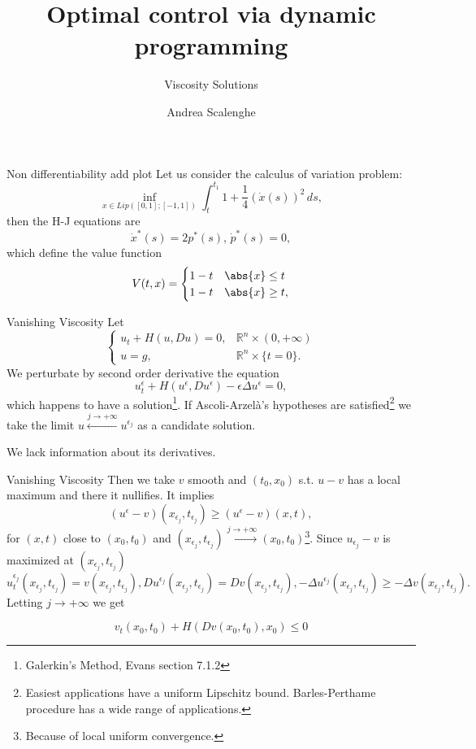 \documentclass[10pt, compress]{beamer}
\title{Optimal control via dynamic programming}
\subtitle{Viscosity Solutions}
\author{Andrea Scalenghe}
\institute{Tesi magistrale}
\newcommand{\R}{\mathbb{R}}
\begin{document}
\maketitle

\begin{frame}{Non differentiability}
add plot
   Let us consider the calculus of variation problem:
\begin{equation*}
    \inf_{x\in Lip([0,1];[-1,1])} \int_t^{t_1} 1 + \frac{1}{4}(\dot{x}(s))^2 \,ds,
\end{equation*}
then the H-J equations are
\[\dot{x}^{\ast}(s) = 2p^{\ast}(s),\,
    \dot{p}^{\ast}(s) = 0,\]
    which define the value function
    \[V(t,x)=\begin{cases}
    1-t & \abs{x}\leq t \\
    1-t& \abs{x}\geq t,
\end{cases}\]
\end{frame}

\begin{frame}{Vanishing Viscosity}
    Let
    \begin{equation}\label{4-1-fullynonlinear}
    \begin{cases}
        u_t + H(u,Du) = 0,& \R^n\times(0,+\infty) \\
        u = g,& \R^n\times\{t=0\}.
    \end{cases}
\end{equation}
We perturbate by second order derivative the equation
\[u^{\epsilon}_t + H(u^{\epsilon},Du^{\epsilon}) -\epsilon\Delta u^{\epsilon}= 0,\]
which happens to have a solution\footnote{Galerkin's Method, Evans section 7.1.2}. If Ascoli-Arzelà's hypotheses are satisfied\footnote{Easiest applications have a uniform Lipschitz bound. Barles-Perthame procedure has a wide range of applications.} we take the limit $u\xleftarrow{j\to+\infty}u^{\epsilon_j}$ as a candidate solution. 

We lack information about its derivatives.
\end{frame}

\begin{frame}{Vanishing Viscosity}
    Then we take $v$ smooth and $(t_0,x_0)$ s.t. $u-v$ has a local maximum and there it nullifies. It implies
    \[(u^{\epsilon}-v)(x_{\epsilon_j},t_{\epsilon_j}) \geq (u^{\epsilon}-v)(x,t),\]
    for $(x,t)$ close to $(x_0,t_0)$ and $(x_{\epsilon_j},t_{\epsilon_j})\xrightarrow{j\to+\infty}(x_0,t_0)$\footnote{Because of local uniform convergence.}. Since $u_{\epsilon_j}-v$ is maximized at $(x_{\epsilon_j},t_{\epsilon_j})$
    \[u^{\epsilon_j}_t(x_{\epsilon_j},t_{\epsilon_j}) =v(x_{\epsilon_j},t_{\epsilon_j}),Du^{\epsilon_j}(x_{\epsilon_j},t_{\epsilon_j})=Dv(x_{\epsilon_j},t_{\epsilon_j}),-\Delta u^{\epsilon_j}(x_{\epsilon_j},t_{\epsilon_j}) \geq -\Delta v(x_{\epsilon_j},t_{\epsilon_j}).\]
    Letting $j\to+\infty$ we get

    \begin{equation}
        v_t(x_0,t_0)+H(Dv(x_0,t_0),x_0)\leq0
    \end{equation}
    
\end{frame}
\end{document}
